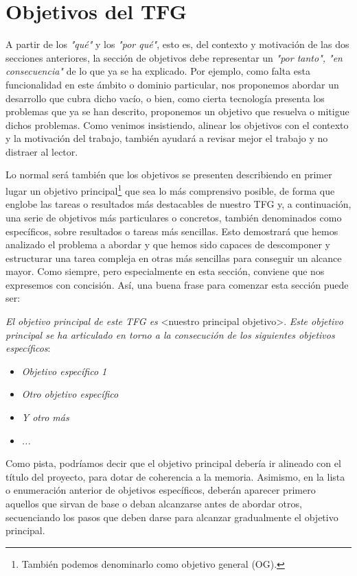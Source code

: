 \section{Objetivos del TFG}
A partir de los \textit{"qué"} y los \textit{"por qué"}, esto es, del contexto y motivación de las dos secciones anteriores, la sección de objetivos debe representar un \textit{"por tanto", "en consecuencia"} de lo que ya se ha explicado. Por ejemplo, como falta esta funcionalidad en este ámbito o dominio particular, nos proponemos abordar un desarrollo que cubra dicho vacío, o bien, como cierta tecnología presenta los problemas que ya se han descrito, proponemos un objetivo que resuelva o mitigue dichos problemas. Como venimos insistiendo, alinear los objetivos con el contexto y la motivación del trabajo, también ayudará a revisar mejor el trabajo y no distraer al lector.

Lo normal será también que los objetivos se presenten describiendo en primer lugar un objetivo principal\footnote{También podemos denominarlo como objetivo general (OG).} que sea lo más comprensivo posible, de forma que englobe las tareas o resultados más destacables de nuestro TFG y,  a continuación, una serie de objetivos más particulares o concretos, también denominados como específicos, sobre resultados o tareas más sencillas. Esto demostrará que hemos analizado el problema a abordar y que hemos sido capaces de descomponer y estructurar una tarea compleja en otras más sencillas para conseguir un alcance mayor. Como siempre, pero especialmente en esta sección, conviene que nos expresemos con concisión. Así, una buena frase para comenzar esta sección puede ser:

\textit{El objetivo principal de este TFG es } \textless nuestro principal objetivo\textgreater. \textit{Este objetivo principal se ha articulado en torno a la consecución de los siguientes objetivos específicos}:
\begin{itemize}
  \item \textit{Objetivo específico 1}
  \item \textit{Otro objetivo específico}
  \item \textit{Y otro más}
  \item \textit{...}
\end{itemize}

Como pista, podríamos decir que el objetivo principal debería ir alineado con el título del proyecto, para dotar de coherencia a la memoria. Asimismo, en la lista o enumeración anterior de objetivos específicos, deberán aparecer primero aquellos que sirvan de base o deban alcanzarse antes de abordar otros, secuenciando los pasos que deben darse para alcanzar gradualmente el objetivo principal.

